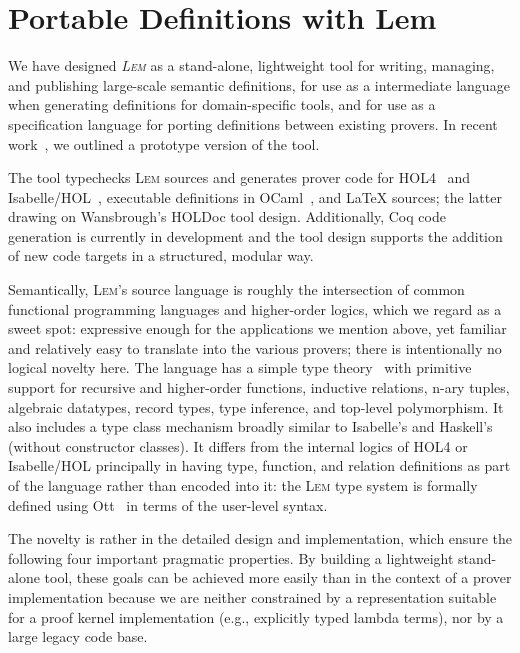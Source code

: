 \documentclass[a4paper]{llncs}
\newcommand{\Lem}{\textsc{Lem}}
\newcommand{\Lemsect}{Lem}
\begin{document}
\section{Portable Definitions with \Lemsect}

We have designed \emph{\Lem{}} as a stand-alone, lightweight tool for writing,
managing, and publishing large-scale semantic definitions, for use as a
intermediate language when generating definitions for domain-specific tools, and
for use as a specification language for porting definitions between existing
provers. In recent work~\cite{Lem-ITP11}, we outlined a prototype version of the
tool.

The tool typechecks \Lem{} sources and generates prover code for HOL4~\cite{HOL}
and Isabelle/HOL~\cite{Isabelle}, executable definitions in OCaml~\cite{ocaml},
and \LaTeX{} sources; the latter drawing on Wansbrough's HOLDoc tool design.
Additionally, Coq code generation is currently in development and the tool
design supports the addition of new code targets in a structured, modular way. 

Semantically, \Lem's source language is roughly the intersection of common
functional programming languages and higher-order logics, which we regard as a
sweet spot: expressive enough for the applications we mention above, yet
familiar and relatively easy to translate into the various provers; there is
intentionally no logical novelty here. The language has a simple type
theory~\cite{church40} with primitive support for recursive and higher-order
functions, inductive relations, n-ary tuples, algebraic datatypes, record types,
type inference, and top-level polymorphism.  It also includes a type class
mechanism broadly similar to Isabelle's and Haskell's~\cite{haskell} (without
constructor classes).  It differs from the internal logics of HOL4 or
Isabelle/HOL principally in having type, function, and relation definitions as
part of the language rather than encoded into it: the \Lem{} type system is
formally defined using Ott~\cite{ott} in terms of the user-level syntax.

The novelty is rather in the detailed design and implementation, which ensure
the following four important pragmatic properties. By building a lightweight
stand-alone tool, these goals can be achieved more easily than in the context of
a prover implementation because we are neither constrained by a representation
suitable for a proof kernel implementation (e.g., explicitly typed lambda
terms), nor by a large legacy code base.
\end{document}
